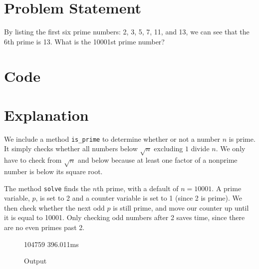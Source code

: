 \documentclass{article}
\begin{document}
    
\section{Problem Statement}

By listing the first six prime numbers: 2, 3, 5, 7, 11, and 13, we can see that the 6th prime is 13. What is the 10001st prime number?

\section{Code}



\section{Explanation}

We include a method \verb|is_prime| to determine whether or not a number $n$ is prime.
It simply checks whether all numbers below $\sqrt{n}$ excluding $1$ divide $n$. We only have to check from $\sqrt{n}$ and below because at least one factor of a nonprime number is below its square root.

The method \verb|solve| finds the $n$th prime, with a default of $n=10001$. A prime variable, $p$, is set to 2
and a counter variable is set to 1 (since 2 is prime). We then check whether the next odd $p$ is still prime, and move our counter up until it is equal to 10001.
Only checking odd numbers after 2 saves time, since there are no even primes past 2.

\begin{figure}[H]
\centering
\begin{BVerbatim*}
104759
396.011ms
\end{BVerbatim*}
\caption{Output}
\end{figure}
\end{document}
